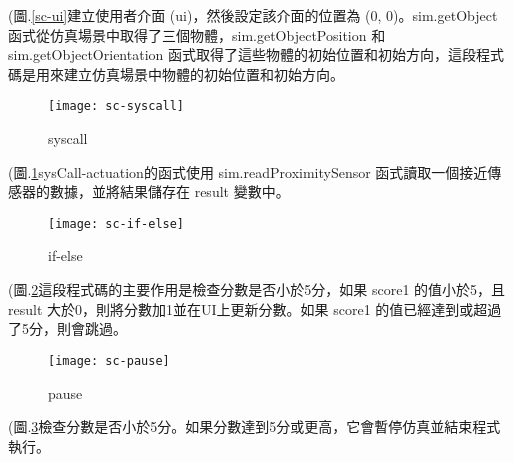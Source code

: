 \newpage
(圖.\ref{sc-ui}建立使用者介面 (ui)，然後設定該介面的位置為 (0, 0)。sim.getObject 函式從仿真場景中取得了三個物體，sim.getObjectPosition 和 sim.getObjectOrientation 函式取得了這些物體的初始位置和初始方向，這段程式碼是用來建立仿真場景中物體的初始位置和初始方向。\\
\begin{figure}[hbt!]
\begin{center}
\texttt{[image: sc-syscall]}
\caption{\Large syscall}\label{sc-syscall}
\end{center}
\end{figure}

(圖.\ref{sc-syscall}sysCall-actuation的函式使用 sim.readProximitySensor 函式讀取一個接近傳感器的數據，並將結果儲存在 result 變數中。\\
\newpage
\begin{figure}[hbt!]
\begin{center}
\texttt{[image: sc-if-else]}
\caption{\Large if-else}\label{sc-if-else}
\end{center}
\end{figure}

(圖.\ref{sc-if-else}這段程式碼的主要作用是檢查分數是否小於5分，如果 score1 的值小於5，且 result 大於0，則將分數加1並在UI上更新分數。如果 score1 的值已經達到或超過了5分，則會跳過。\\
\begin{figure}[hbt!]
\begin{center}
\texttt{[image: sc-pause]}
\caption{\Large pause}\label{sc-pause}
\end{center}
\end{figure}

(圖.\ref{sc-pause}檢查分數是否小於5分。如果分數達到5分或更高，它會暫停仿真並結束程式執行。\\













